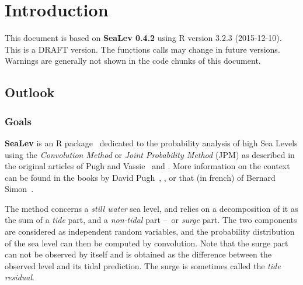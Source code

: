 \documentclass[11pt,a4paper]{report}\usepackage[]{graphicx}\usepackage[]{color}
\newenvironment{Prov}
   {\medskip \par \noindent%
    \sf \color{blue} }%
  {\medskip \par}
\begin{document}
\pagebreak
{}  %
\setcounter{page}{1}

\chapter{Introduction}

\begin{Prov}
  This document is based on \textbf{SeaLev
    0.4.2} using R version 3.2.3 (2015-12-10).  This is
  a DRAFT version. The functions calls may change in future
  versions. Warnings are generally not shown in the code chunks of
  this document.
\end{Prov}



\section{Outlook}
\subsection{Goals}
\textbf{SeaLev} is an R package~\cite{RMANUAL} dedicated to the
probability analysis of high Sea Levels using the \textit{Convolution
  Method} or \textit{Joint Probability Method} (JPM) as described in
the original articles of Pugh and Vassie~\cite{PUGHVASSIE79} and \cite{PUGHVASSIE80}.
More information on the context can be found in the books by David
Pugh~\cite[chap.~8]{PUGHBOOK1}, \cite[chap.~6]{PUGHBOOK2}, or that (in french) of Bernard
Simon~\cite[chap.~VIII]{SIMON}. 

The method concerns a \textit{still water} sea level, and relies on a
decomposition of it as the sum of a \textit{tide} part, and a
\textit{non-tidal} part --~or \textit{surge} part. The two components
are considered as independent random variables, and the probability
distribution of the sea level can then be computed by
convolution. Note that the surge part can not be observed by itself
and is obtained as the difference between the observed level and 
its tidal prediction. The surge is sometimes called the \textit{tide residual}.
\end{document}
